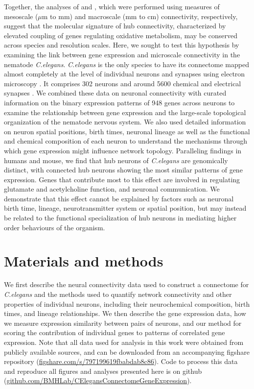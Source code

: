 Together, the analyses of \citet{Fulcher2016} and \citet{Vertes2016b}, which were performed using measures of mesoscale ($\mu$m to mm) and macroscale (mm to cm) connectivity, respectively, suggest that the molecular signature of hub connectivity, characterized by elevated coupling of genes regulating oxidative metabolism, may be conserved across species and resolution scales.
Here, we sought to test this hypothesis by examining the link between gene expression and microscale connectivity in the nematode \emph{C.elegans}.
\emph{C.elegans} is the only species to have its connectome mapped almost completely at the level of individual neurons and synapses using electron microscopy \citep{White1986, Varshney2011}.
It comprises 302 neurons and around 5600 chemical and electrical synapses \citep{White1986}.
We combined these data on neuronal connectivity with curated information on the binary expression patterns of 948 genes across neurons to examine the relationship between gene expression and the large-scale topological organization of the nematode nervous system.
We also used detailed information on neuron spatial positions, birth times, neuronal lineage as well as the functional and chemical composition of each neuron to understand the mechanisms through which gene expression might influence network topology.
Paralleling findings in humans and mouse, we find that hub neurons of \emph{C.elegans} are genomically distinct, with connected hub neurons showing the most similar patterns of gene expression.
Genes that contribute most to this effect are involved in regulating glutamate and acetylcholine function, and neuronal communication.
We demonstrate that this effect cannot be explained by factors such as neuronal birth time, lineage, neurotransmitter system or spatial position, but may instead be related to the functional specialization of hub neurons in mediating higher order behaviours of the organism.

\section{Materials and methods}
\label{Ch2Methods}

We first describe the neural connectivity data used to construct a connectome for \textit{C.elegans} and the methods used to quantify network connectivity and other properties of individual neurons, including their neurochemical composition, birth times, and lineage relationships.
We then describe the gene expression data, how we measure expression similarity between pairs of neurons, and our method for scoring the contribution of individual genes to patterns of correlated gene expression.
Note that all data used for analysis in this work were obtained from publicly available sources, and can be downloaded from an accompanying figshare repository (\url{figshare.com/s/797199619fbabdab8c86}).
Code to process this data and reproduce all figures and analyses presented here is on github (\url{github.com/BMHLab/CElegansConnectomeGeneExpression}).

